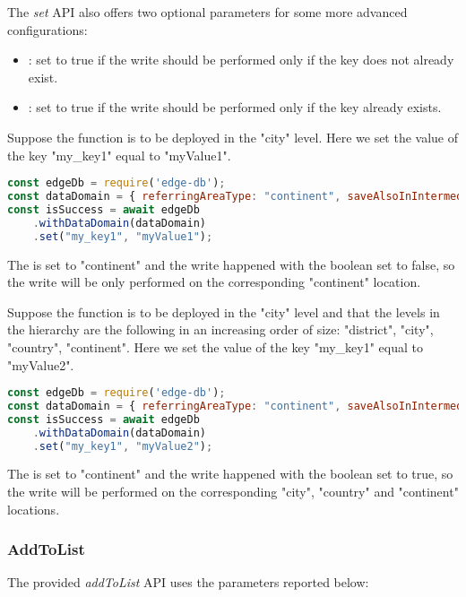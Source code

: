The \textit{set} API also offers two optional parameters for some more advanced configurations:
\begin{itemize}
    \item {}: set to true if the write should be performed only if the key does not already exist.
    \item {}: set to true if the write should be performed only if the key already exists.
\end{itemize}

\begin{example}
Suppose the function is to be deployed in the "city" level. Here we set the value of the key "my\_key1" equal to "myValue1".
\begin{lstlisting}[language=javascript]
const edgeDb = require('edge-db');
const dataDomain = { referringAreaType: "continent", saveAlsoInIntermediateLevels: false, ttl: 60*60*1000 };
const isSuccess = await edgeDb
    .withDataDomain(dataDomain)
    .set("my_key1", "myValue1");
\end{lstlisting}
The  is set to "continent" and the write happened with the  boolean set to false, so the write will be only performed on the corresponding "continent" location.
\end{example}

\begin{example}
Suppose the function is to be deployed in the "city" level and that the levels in the hierarchy are the following in an increasing order of size: "district", "city", "country", "continent". Here we set the value of the key "my\_key1" equal to "myValue2".
\begin{lstlisting}[language=javascript]
const edgeDb = require('edge-db');
const dataDomain = { referringAreaType: "continent", saveAlsoInIntermediateLevels: true, ttl: 60*60*1000 };
const isSuccess = await edgeDb
    .withDataDomain(dataDomain)
    .set("my_key1", "myValue2");
\end{lstlisting}
The  is set to "continent" and the write happened with the  boolean set to true, so the write will be performed on the corresponding "city", "country" and "continent" locations.
\end{example}


\subsubsection{AddToList}
The provided \textit{addToList} API uses the parameters reported below:

